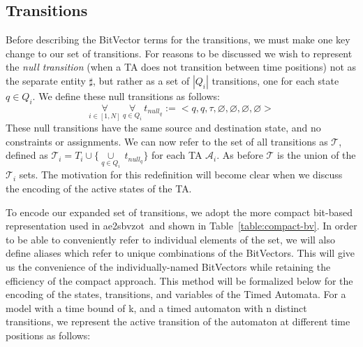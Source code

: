 \documentclass[a4paper,11pt]{report}
\theoremstyle{definition}
\newcommand{\aez}{ae2sbvzot}
\begin{document}

\subsection{Transitions}\label{encoding-transitions}

Before describing the BitVector terms for the transitions, we must make one key
change to our set of transitions. For reasons to be discussed we wish to
represent the \emph{null transition} (when a TA does not transition between time
positions) not as the separate entity \(\sharp\), but rather as a set of
$|Q_{i}|$ transitions, one for each state $q \in Q_{i}$. We define these null
transitions as follows:
\[\underset{i \in [1,N]}{\forall}\ \underset{q \in Q_{i}}{\forall}\ t_{null_q} := {<}q, q, \tau, \varnothing, \varnothing, \varnothing, \varnothing {>}\]
These null transitions have the same source and destination state, and no
constraints or assignments. We can now refer to the set of all transitions as
\(\mathcal{T}\), defined as
\(\mathcal{T}_{i} = T_{i} \cup \{\underset{q \in Q_{i}}{\cup}\ t_{null_{q}}\}\)
for each TA \(\mathcal{A}_{i}\). As before \(\mathcal{T}\) is the union of the
\(\mathcal{T}_{i}\) sets. The motivation for this redefinition will become clear
when we discuss the encoding of the active states of the TA.


To encode our expanded set of transitions, we adopt the more compact bit-based
representation used in \aez\ and shown in Table~\ref{table:compact-bv}. In order
to be able to conveniently refer to individual elements of the set, we will also
define aliases which refer to unique combinations of the BitVectors. This will
give us the convenience of the individually-named BitVectors while retaining the
efficiency of the compact approach. This method will be formalized below for the
encoding of the states, transitions, and variables of the Timed Automata.
For a model with a time bound of k, and a timed automaton with n distinct
transitions, we represent the active transition of the automaton at different
time positions as follows:
\end{document}
